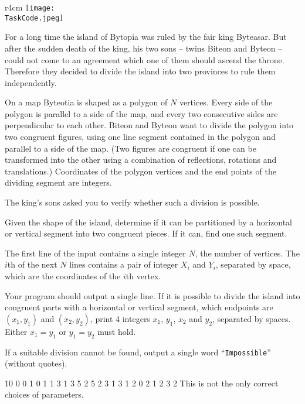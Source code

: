 \documentclass{boi2014}
\renewcommand{\TaskCode}{demarcation}
\newcommand{\constant}[1]{{\tt #1}}
\begin{document}
    \begin{wrapfigure}{r}{4cm}
		\texttt{[image: \\TaskCode.jpeg]}
	\end{wrapfigure}

    For a long time the island of Bytopia was ruled by the fair king
    Byteasar. But after the sudden death
    of the king, his two sons -- twins Biteon and Byteon -- could
    not come to an agreement which one of them should ascend the throne.
    Therefore they decided to divide the island into two provinces to
    rule them independently.  
 
    On a map Byteotia is shaped as a polygon of $N$ vertices. Every
    side of the polygon is parallel to a side of the map, and every
    two consecutive sides are perpendicular to each other.  Biteon
    and Byteon want to divide the polygon into two congruent figures,
    using one line segment contained in the polygon and parallel to a
    side of the map.  (Two figures are congruent if one can be transformed
    into the other using a combination of reflections, rotations and
    translations.) Coordinates of the polygon vertices and the end points
    of the dividing segment are integers.  
 
    The king's sons asked you to verify whether such a division is
    possible.

    \Task

    Given the shape of the island, determine if it can be partitioned
    by a horizontal or vertical segment into two congruent pieces. If
    it can, find one such segment.

    \Input
	The first line of the input contains a single integer $N$, the number of
	vertices. The $i$th of the next $N$ lines contains a pair of integer $X_i$
	and $Y_i$, separated by space, which are the coordinates of the $i$th
	vertex.

	\Output
	Your program should output a single line. If it is possible to divide the
	island into congruent parts with a horizontal or vertical segment, which
	endpoints are $(x_1, y_1)$ and $(x_2, y_2)$, print 4 integers $x_1$,
	$y_1$, $x_2$ and $y_2$, separated by spaces.
	Either $x_1 = y_1$ or $y_1 = y_2$ must hold.

	If a suitable division cannot be found, output a single word
	``\constant{Impossible}'' (without quotes).

    \Examples
	\example
	{
		10
		0 0
		1 0
		1 1
		3 1
		3 5
		2 5
		2 3
		1 3
		1 2
		0 2
	}
	{
		1 2 3 2
	}
	{
		This is not the only correct choices of parameters.
	}
\end{document}
